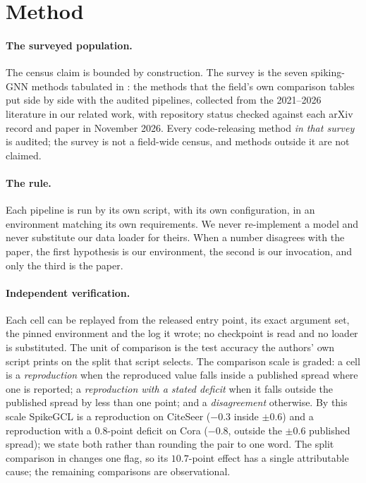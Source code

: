 \section{Method}
\label{sec:protocol}



\paragraph{The surveyed population.} The census claim is bounded by construction. The survey is
the seven spiking-GNN methods tabulated in : the methods that the field's own
comparison tables put side by side with the audited pipelines, collected from the 2021--2026
literature in our related work, with repository status checked against each arXiv record and paper
in November 2026. Every code-releasing method \emph{in that survey} is audited; the survey is not
a field-wide census, and methods outside it are not claimed.

\paragraph{The rule.} Each pipeline is run by its own script, with its own configuration, in an
environment matching its own requirements. We never re-implement a model and never substitute our
data loader for theirs. When a number disagrees with the paper, the first hypothesis is our
environment, the second is our invocation, and only the third is the paper.

\paragraph{Independent verification.} Each cell can be replayed from the released entry point, its
exact argument set, the pinned environment and the log it wrote; no checkpoint is read and no loader
is substituted. The unit of comparison is the test accuracy the authors' own script prints on the
split that script selects. The comparison scale is graded: a cell is a \emph{reproduction} when the
reproduced value falls inside a published spread where one is reported; a \emph{reproduction with a
stated deficit} when it falls outside the published spread by less than one point; and a
\emph{disagreement} otherwise. By this scale SpikeGCL is a
reproduction on CiteSeer ($-0.3$ inside $\pm 0.6$) and a reproduction with a $0.8$-point
deficit on Cora ($-0.8$, outside the $\pm 0.6$ published spread); we state
both rather than rounding the pair to one word. The split comparison in  changes
one flag, so its $10.7$-point effect has a single attributable cause; the remaining comparisons are
observational.

